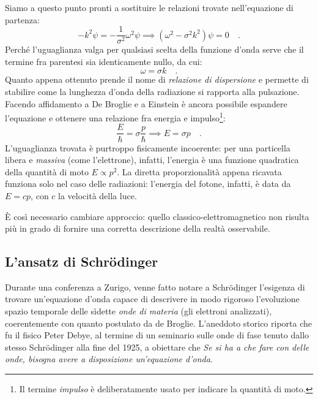 Siamo a questo punto pronti a sostituire le relazioni trovate nell'equazione di partenza:
\[
            -k^2\psi = -\frac{1}{\sigma^2} \omega^2 \psi \implies (\omega^2-\sigma^2 k^2)\psi = 0\quad.
\]
Perché l'uguaglianza valga per qualsiasi scelta della funzione d'onda serve che il termine fra parentesi sia identicamente nullo, da cui:
\[
    \omega = \sigma k \quad.
\]
Quanto appena ottenuto prende il nome di \emph{relazione di dispersione} e permette di stabilire come la lunghezza d'onda della radiazione si rapporta alla pulsazione. Facendo affidamento a De Broglie e a Einstein è ancora possibile espandere l'equazione e ottenere una relazione fra energia e impulso\footnote{Il termine \emph{impulso} è deliberatamente usato per indicare la quantità di moto.}:
\[
    \frac{E}{\hbar} = {\sigma} \frac{p}{\hbar} \implies
    E = {\sigma} p
    \quad .
\]
L'uguaglianza trovata è purtroppo fisicamente incoerente: per una particella libera e \emph{massiva} (come l'elettrone), infatti, l'energia è una funzione quadratica della quantità di moto $E \propto p^2$. La diretta proporzionalità appena ricavata funziona solo nel caso delle radiazioni: l'energia del fotone, infatti, è data da $E = cp$, con $c$ la velocità della luce.

È così necessario cambiare approccio: quello classico-elettromagnetico non risulta più in grado di fornire una corretta descrizione della realtà osservabile.

\subsection{L'ansatz di Schrödinger}
Durante una conferenza a Zurigo, venne fatto notare a Schrödinger l'esigenza di trovare un'equazione d'onda capace di descrivere in modo rigoroso l'evoluzione spazio temporale delle sìdette \emph{onde di materia} (gli elettroni analizzati), coerentemente con quanto postulato da de Broglie. L'aneddoto storico riporta che fu il fisico Peter Debye, al termine di un seminario sulle onde di fase tenuto dallo stesso Schrödinger alla fine del 1925, a obiettare che \guillemetleft\emph{Se si ha a che fare con delle onde, bisogna avere a disposizione un'equazione d'onda}\guillemetright.

